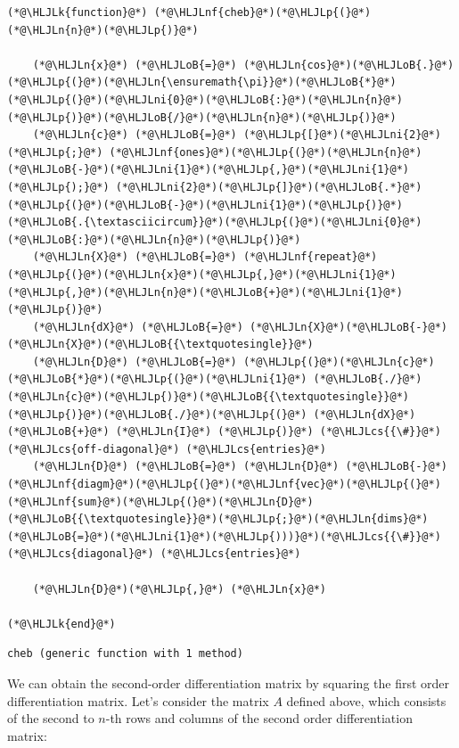 \documentclass[12pt,a4paper]{article}
\newcommand{\HLJLk}[1]{\textcolor[RGB]{148,91,176}{\textbf{#1}}}
\newcommand{\HLJLn}[1]{#1}
\newcommand{\HLJLnf}[1]{\textcolor[RGB]{66,102,213}{#1}}
\newcommand{\HLJLni}[1]{\textcolor[RGB]{59,151,46}{#1}}
\newcommand{\HLJLoB}[1]{\textcolor[RGB]{102,102,102}{\textbf{#1}}}
\newcommand{\HLJLp}[1]{#1}
\newcommand{\HLJLcs}[1]{\textcolor[RGB]{153,153,119}{\textit{#1}}}
\begin{document}
\begin{lstlisting}
(*@\HLJLk{function}@*) (*@\HLJLnf{cheb}@*)(*@\HLJLp{(}@*)(*@\HLJLn{n}@*)(*@\HLJLp{)}@*)

    (*@\HLJLn{x}@*) (*@\HLJLoB{=}@*) (*@\HLJLn{cos}@*)(*@\HLJLoB{.}@*)(*@\HLJLp{(}@*)(*@\HLJLn{\ensuremath{\pi}}@*)(*@\HLJLoB{*}@*)(*@\HLJLp{(}@*)(*@\HLJLni{0}@*)(*@\HLJLoB{:}@*)(*@\HLJLn{n}@*)(*@\HLJLp{)}@*)(*@\HLJLoB{/}@*)(*@\HLJLn{n}@*)(*@\HLJLp{)}@*)
    (*@\HLJLn{c}@*) (*@\HLJLoB{=}@*) (*@\HLJLp{[}@*)(*@\HLJLni{2}@*)(*@\HLJLp{;}@*) (*@\HLJLnf{ones}@*)(*@\HLJLp{(}@*)(*@\HLJLn{n}@*)(*@\HLJLoB{-}@*)(*@\HLJLni{1}@*)(*@\HLJLp{,}@*)(*@\HLJLni{1}@*)(*@\HLJLp{);}@*) (*@\HLJLni{2}@*)(*@\HLJLp{]}@*)(*@\HLJLoB{.*}@*)(*@\HLJLp{(}@*)(*@\HLJLoB{-}@*)(*@\HLJLni{1}@*)(*@\HLJLp{)}@*)(*@\HLJLoB{.{\textasciicircum}}@*)(*@\HLJLp{(}@*)(*@\HLJLni{0}@*)(*@\HLJLoB{:}@*)(*@\HLJLn{n}@*)(*@\HLJLp{)}@*)
    (*@\HLJLn{X}@*) (*@\HLJLoB{=}@*) (*@\HLJLnf{repeat}@*)(*@\HLJLp{(}@*)(*@\HLJLn{x}@*)(*@\HLJLp{,}@*)(*@\HLJLni{1}@*)(*@\HLJLp{,}@*)(*@\HLJLn{n}@*)(*@\HLJLoB{+}@*)(*@\HLJLni{1}@*)(*@\HLJLp{)}@*)
    (*@\HLJLn{dX}@*) (*@\HLJLoB{=}@*) (*@\HLJLn{X}@*)(*@\HLJLoB{-}@*)(*@\HLJLn{X}@*)(*@\HLJLoB{{\textquotesingle}}@*)
    (*@\HLJLn{D}@*) (*@\HLJLoB{=}@*) (*@\HLJLp{(}@*)(*@\HLJLn{c}@*)(*@\HLJLoB{*}@*)(*@\HLJLp{(}@*)(*@\HLJLni{1}@*) (*@\HLJLoB{./}@*)(*@\HLJLn{c}@*)(*@\HLJLp{)}@*)(*@\HLJLoB{{\textquotesingle}}@*)(*@\HLJLp{)}@*)(*@\HLJLoB{./}@*)(*@\HLJLp{(}@*) (*@\HLJLn{dX}@*) (*@\HLJLoB{+}@*) (*@\HLJLn{I}@*) (*@\HLJLp{)}@*) (*@\HLJLcs{{\#}}@*) (*@\HLJLcs{off-diagonal}@*) (*@\HLJLcs{entries}@*)
    (*@\HLJLn{D}@*) (*@\HLJLoB{=}@*) (*@\HLJLn{D}@*) (*@\HLJLoB{-}@*) (*@\HLJLnf{diagm}@*)(*@\HLJLp{(}@*)(*@\HLJLnf{vec}@*)(*@\HLJLp{(}@*)(*@\HLJLnf{sum}@*)(*@\HLJLp{(}@*)(*@\HLJLn{D}@*)(*@\HLJLoB{{\textquotesingle}}@*)(*@\HLJLp{;}@*)(*@\HLJLn{dims}@*)(*@\HLJLoB{=}@*)(*@\HLJLni{1}@*)(*@\HLJLp{)))}@*)(*@\HLJLcs{{\#}}@*) (*@\HLJLcs{diagonal}@*) (*@\HLJLcs{entries}@*)
    
    (*@\HLJLn{D}@*)(*@\HLJLp{,}@*) (*@\HLJLn{x}@*)

(*@\HLJLk{end}@*)
\end{lstlisting}

\begin{lstlisting}
cheb (generic function with 1 method)
\end{lstlisting}


We can obtain the second-order differentiation matrix by squaring the first order differentiation matrix.  Let's consider the matrix $A$ defined above, which consists of the second to $n$-th rows and columns of the second order differentiation matrix:
\end{document}

